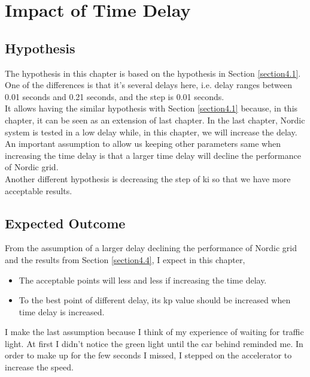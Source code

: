 \documentclass{report}
\begin{document}
\chapter{Impact of Time Delay}
\label{Chapter5}
\section{Hypothesis} %
The hypothesis in this chapter is based on the hypothesis in Section \textcolor{red}{\ref{section4.1}}. \\
 
One of the differences is that it's several delays here, i.e. delay ranges between 0.01 seconds and 0.21 seconds, and the step is 0.01 seconds. \\

It allows having the similar hypothesis with Section \textcolor{red}{\ref{section4.1}} because, in this chapter, it can be seen as an extension of last chapter. In the last chapter, Nordic system is tested in a low delay while, in this chapter, we will increase the delay. \\

An important assumption to allow us keeping other parameters same when increasing the time delay is that a larger time delay will decline the performance of Nordic grid. \\

Another different hypothesis is decreasing the step of ki so that we have more acceptable results. \\

\section{Expected Outcome} %
From the assumption of a larger delay declining the performance of Nordic grid and the results from Section \textcolor{red}{\ref{section4.4}}, I expect in this chapter,\\

\begin{itemize}
    \item The acceptable points will less and less if increasing the time delay. \\
    \item To the best point of different delay, its kp value should be increased when time delay is increased. \\
\end{itemize}


I make the last assumption because I think of my experience of waiting for traffic light. At first I didn't notice the green light until the car behind reminded me. In order to make up for the few seconds I missed, I stepped on the accelerator to increase the speed.\\ 
\end{document}
